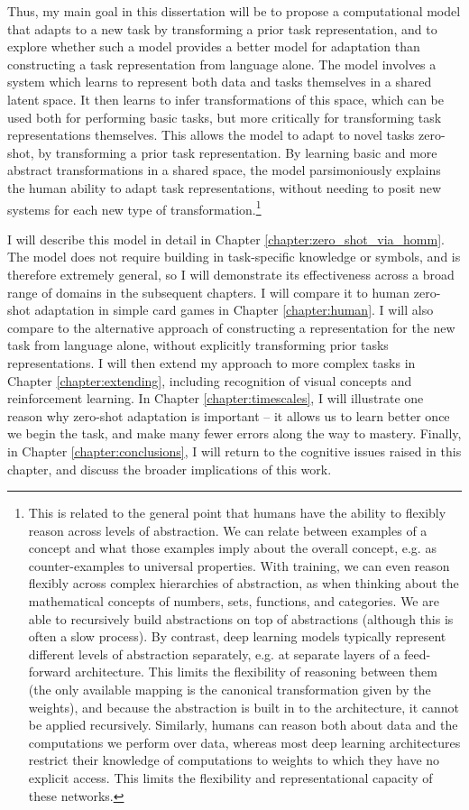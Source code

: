 Thus, my main goal in this dissertation will be to propose a computational model that adapts to a new task by transforming a prior task representation, and to explore whether such a model provides a better model for adaptation than constructing a task representation from language alone. The model involves a system which learns to represent both data and tasks themselves in a shared latent space. It then learns to infer transformations of this space, which can be used both for performing basic tasks, but more critically for transforming task representations themselves. This allows the model to adapt to novel tasks zero-shot, by transforming a prior task representation. By learning basic and more abstract transformations in a shared space, the model parsimoniously explains the human ability to adapt task representations, without needing to posit new systems for each new type of transformation.\footnote{This is related to the general point that humans have the ability to flexibly reason across levels of abstraction. We can relate between examples of a concept and what those examples imply about the overall concept, e.g. as counter-examples to universal properties. With training, we can even reason flexibly across complex hierarchies of abstraction, as when thinking about the mathematical concepts of numbers, sets, functions, and categories. We are able to recursively build abstractions on top of abstractions (although this is often a slow process). By contrast, deep learning models typically represent different levels of abstraction separately, e.g. at separate layers of a feed-forward architecture. This limits the flexibility of reasoning between them (the only available mapping is the canonical transformation given by the weights), and because the abstraction is built in to the architecture, it cannot be applied recursively. Similarly, humans can reason both about data and the computations we perform over data, whereas most deep learning architectures restrict their knowledge of computations to weights to which they have no explicit access. This limits the flexibility and representational capacity of these networks.} \par 
I will describe this model in detail in Chapter \ref{chapter:zero_shot_via_homm}. The model does not require building in task-specific knowledge or symbols, and is therefore extremely general, so I will demonstrate its effectiveness across a broad range of domains in the subsequent chapters. I will compare it to human zero-shot adaptation in simple card games in Chapter \ref{chapter:human}. I will also compare to the alternative approach of constructing a representation for the new task from language alone, without explicitly transforming prior tasks representations. I will then extend my approach to more complex tasks in Chapter \ref{chapter:extending}, including recognition of visual concepts and reinforcement learning. In Chapter \ref{chapter:timescales}, I will illustrate one reason why zero-shot adaptation is important -- it allows us to learn better once we begin the task, and make many fewer errors along the way to mastery. Finally, in Chapter \ref{chapter:conclusions}, I will return to the cognitive issues raised in this chapter, and discuss the broader implications of this work.\par 


